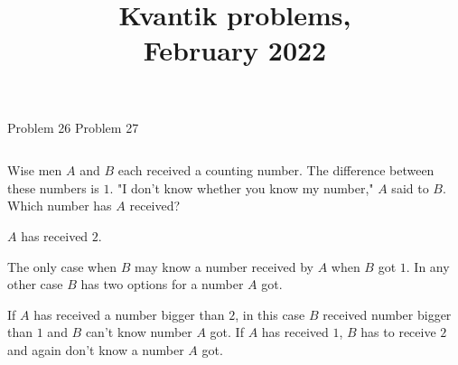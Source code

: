 \documentclass[9pt,aspectratio=169]{beamer}
\title{Kvantik problems,\\ February 2022}
\begin{document}
\maketitle

\begin{frame}{Problem 26 \hspace*{5cm} Problem 27}
  \begin{columns}[T]
    \begin{column}{0.5\textwidth}
      \begin{problem}
        Wise men $A$ and $B$ each received a counting number. The difference between these numbers is $1$. "I don't know whether you know my number," $A$ said to $B$. Which number has $A$ received?
      \end{problem}
      $A$ has received $2$.

      The only case when $B$ may know a number received by $A$ when $B$ got $1$. In any other case $B$ has two options for a number $A$ got.

      If $A$ has received a number bigger than $2$, in this case $B$ received number bigger than $1$ and $B$ can't know number $A$ got. If $A$ has received $1$, $B$ has to receive $2$ and again don't know a number $A$ got.


\end{column}
\end{columns}
\end{frame}
\end{document}
